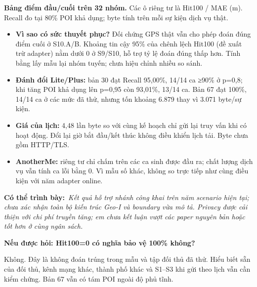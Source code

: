 \documentclass[10pt,a4paper]{article}
\newcommand{\say}[1]{\par\textbf{Có thể trình bày:}\ \textit{#1}\par}
\newcommand{\ask}[2]{\par\textbf{Nếu được hỏi: #1}\par #2\par}
\begin{document}
\textbf{Bảng điểm đầu/cuối trên 32 nhóm.} Các ô riêng tư là Hit100 / MAE (m). Recall đo tại 80\% POI khả dụng; byte tính trên mỗi sự kiện dịch vụ thật.
\EndpointEvidence
\begin{itemize}
\item \textbf{Vì sao có sức thuyết phục?} Đối chứng GPS thật vẫn cho phép đoán đúng điểm cuối ở S10.A/B. Khoảng tin cậy 95\% của chênh lệch Hit100 (đề xuất trừ adapter) nằm dưới 0 ở S9/S10, hỗ trợ tỷ lệ đoán đúng thấp hơn. Tính bằng lấy mẫu lại nhóm tuyến; chưa hiệu chỉnh nhiều so sánh.
\item \textbf{Đánh đổi Lite/Plus:} bản 30 đạt Recall 95,00\%, 14/14 ca ≥90\% ở p=0,8; khi tăng POI khả dụng lên p=0,95 còn 93,01\%, 13/14 ca. Bản 67 đạt 100\%, 14/14 ca ở các mức đã thử, nhưng tốn khoảng 6.879 thay vì 3.071 byte/sự kiện.
\item \textbf{Giá của lịch:} 4,48 lần byte so với cùng kế hoạch chỉ gửi lại truy vấn khi có hoạt động. Đổi lại giờ bắt đầu/kết thúc không điều khiển lịch tải. Byte chưa gồm HTTP/TLS.
\item \textbf{AnotherMe:} riêng tư chỉ chấm trên các ca sinh được đầu ra; chất lượng dịch vụ vẫn tính ca lỗi bằng 0. Vì mẫu số khác, không so trực tiếp như cùng điều kiện với năm adapter online.
\end{itemize}
\say{Kết quả hỗ trợ nhánh công khai trên năm scenario hiện tại; chưa xác nhận toàn bộ kiến trúc Geo-I và boundary vừa mô tả. Privacy được cải thiện với chi phí truyền tăng; em chưa kết luận vượt các paper nguyên bản hoặc tốt hơn ở cùng ngân sách.}
\ask{Hit100=0 có nghĩa bảo vệ 100\% không?}{Không. Đây là không đoán trúng trong mẫu và tập đối thủ đã thử. Hiểu biết sẵn của đối thủ, kênh mạng khác, thành phố khác và S1–S3 khi gửi theo lịch vẫn cần kiểm chứng. Bản 67 vẫn có tám POI ngoài độ phủ tĩnh.}

\clearpage

\end{document}

